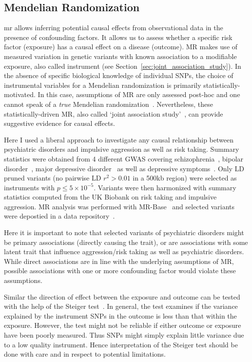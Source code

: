 \subsection{Mendelian Randomization}
\label{sub:Selection_of_Intstuments}

\acrfull{mr} allows  inferring potential causal effects from observational data in the presence of confounding factors. 
It allows us to assess whether a specific risk factor (exposure) has a causal effect on a disease (outcome).
MR makes use of measured variation in genetic variants with known association to a modifiable exposure, also called instrument (see Section~\ref{sec:joint_association_study}).
In the absence of specific biological knowledge of individual SNPs, the choice of instrumental variables for a Mendelian randomization  is primarily statistically-motivated.
In this case, assumptions of MR are only assessed post-hoc and one cannot speak of a \textit{true} Mendelian randomization~\cite{Burgess2016a}.
Nevertheless, these statistically-driven MR, also called `joint association study'~\cite{Burgess2016a}, can provide suggestive evidence for causal effects.

Here I used a liberal approach to investigate any causal relationship between psychiatric disorders and impulsive aggression as well as risk taking.
Summary statistics were obtained from 4 different GWAS covering schizophrenia~\cite{Ripke2014}, bipolar disorder~\cite{PsychiatricGWASConsortiumBipolarDisorderWorkingGroup2011}, major depressive disorder~\cite{MajorDepressiveDisorderWorkingGroupofthePsychiatricGWASConsortium2013} as well as depressive symptoms~\cite{Okbay2016}.
Only LD pruned variants (no pairwise LD $r^2>0.01$ in a 500kb region) were selected as instruments with $p\leq 5\times 10^{-5}$.
Variants were then harmonized with summary statistics computed from the UK Biobank on risk taking and impulsive aggression. 
MR analysis was performed with MR-Base~\cite{Hemani2016} and selected variants were depostied in a data repository~\cite{Porsch2017}.

Here it is important to note that selected variants of psychiatric disorders might be primary associations (directly causing the trait), or are associations with some latent trait that influence aggression/risk taking as well as psychiatric disorders.
While direct associations are in line with the underlying assumptions of MR, possible associations with one or more confounding factor would violate these assumptions. 

Similar the direction of effect between the exposure and outcome can be tested with the help of the Steiger test~\cite{Steiger1980}.
In general, the test examines if the variance explained by the instrument SNPs in the outcome is less than that within the exposure. 
However, the test might not be reliable if either outcome or exposure have been poorly measured.
Thus SNPs might simply explain little variance due to a low quality instrument. 
Hence interpretation of the Steiger test should be done with care and in respect to potential limitations.
